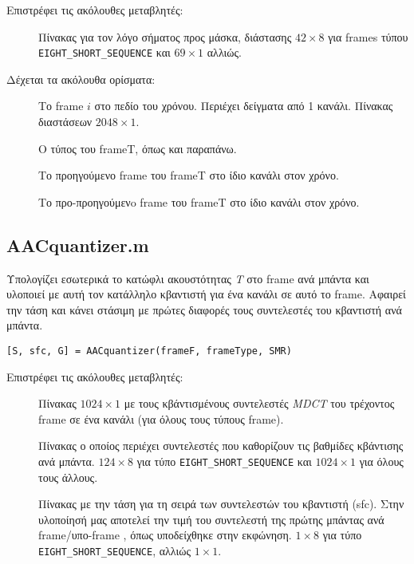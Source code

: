 \noindent Επιστρέφει τις ακόλουθες μεταβλητές:
\begin{description}
  \item[] Πίνακας για τον λόγο σήματος προς μάσκα, διάστασης $42 \times 8$
    για frames τύπου \verb|EIGHT_SHORT_SEQUENCE| και $69 \times 1$ αλλιώς.
\end{description}

\noindent Δέχεται τα ακόλουθα ορίσματα:
\begin{description}
  \item[] Το frame $i$ στο πεδίο του χρόνου. Περιέχει δείγματα από 1 κανάλι.
    Πίνακας διαστάσεων $2048 \times 1$.
  \item[] Ο τύπος του frameT, όπως και παραπάνω.
  \item[] Το προηγούμενο frame του frameT στο ίδιο κανάλι στον χρόνο.
  \item[] Το προ-προηγούμενo frame του frameT στο ίδιο κανάλι στον χρόνο.
\end{description}

\subsection*{AACquantizer.m}
Υπολογίζει εσωτερικά το κατώφλι ακουστότητας \emph{T} στο frame ανά μπάντα και
υλοποιεί με αυτή τον κατάλληλο κβαντιστή για ένα κανάλι σε αυτό το frame.
Αφαιρεί την τάση και κάνει στάσιμη με πρώτες διαφορές τους συντελεστές του κβαντιστή
ανά μπάντα.
\begin{center}
  \verb|[S, sfc, G] = AACquantizer(frameF, frameType, SMR)|
\end{center}

\noindent Επιστρέφει τις ακόλουθες μεταβλητές:
\begin{description}
  \item[] Πίνακας $1024 \times 1$ με τους κβάντισμένους συντελεστές
    \emph{MDCT} του τρέχοντος frame σε ένα κανάλι (για όλους τους τύπους frame).
  \item[] Πίνακας ο οποίος περιέχει συντελεστές που καθορίζουν τις βαθμίδες κβάντισης
    ανά μπάντα. $124 \times 8$ για τύπο \verb|EIGHT_SHORT_SEQUENCE| και $1024 \times 1$
    για όλους τους άλλους.
  \item[] Πίνακας με την τάση για τη σειρά των συντελεστών του κβαντιστή (sfc).
    Στην υλοποίησή μας αποτελεί την τιμή του συντελεστή της πρώτης μπάντας ανά frame/υπο-frame
    , όπως υποδείχθηκε στην εκφώνηση. $1 \times 8$ για τύπο \verb|EIGHT_SHORT_SEQUENCE|, αλλιώς $1 \times 1$.
\end{description}

